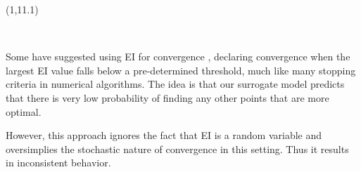\documentclass[a0,landscape]{a0poster}
\newcommand{\co}[2]{{{\bf \color{#1}{#2}}}}
\begin{document}
\begin{textblock}{6}(1,11.1)

\begin{center}
\LARGE \textsc{\co{purple}{When to Declare Convergence?}}\\
\end{center}
\large

\noindent
Some have suggested using EI for convergence \citep{windExample}, 
declaring convergence when the largest EI value falls below a pre-determined
threshold, much like many stopping criteria in numerical algorithms.
The idea is that our surrogate model predicts that there is very low 
probability of finding any other points that are more optimal.

\vspace{0.3in}
\noindent
However, this approach ignores the fact that EI is a random variable
and oversimplies the stochastic nature of convergence in this setting.
Thus it results in inconsistent behavior.
\end{textblock}


\end{document}
